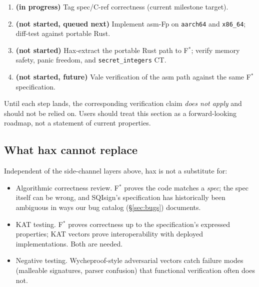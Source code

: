 \begin{enumerate}[nosep]
  \item \textbf{(in progress)} Tag spec/C-ref correctness (current
        milestone target).
  \item \textbf{(not started, queued next)} Implement asm-Fp on
        \texttt{aarch64} and \texttt{x86\_64}; diff-test against
        portable Rust.
  \item \textbf{(not started)} Hax-extract the portable Rust path
        to F$^*$; verify memory safety, panic freedom, and
        \texttt{secret\_integers} CT.
  \item \textbf{(not started, future)} Vale verification of the
        asm path against the same F$^*$ specification.
\end{enumerate}

Until each step lands, the corresponding verification claim
\emph{does not apply} and should not be relied on.  Users should
treat this section as a forward-looking roadmap, not a statement
of current properties.

\subsection{What hax cannot replace}

Independent of the side-channel layers above, hax is not a
substitute for:

\begin{itemize}[nosep]
  \item Algorithmic correctness review.  F$^*$ proves the code
        matches a \emph{spec}; the spec itself can be wrong, and
        SQIsign's specification has historically been ambiguous in
        ways our bug catalog (\S\ref{sec:bugs}) documents.
  \item KAT testing.  F$^*$ proves correctness up to the
        specification's expressed properties; KAT vectors prove
        interoperability with deployed implementations.  Both are
        needed.
  \item Negative testing.  Wycheproof-style adversarial vectors
        catch failure modes (malleable signatures, parser
        confusion) that functional verification often does not.
\end{itemize}
